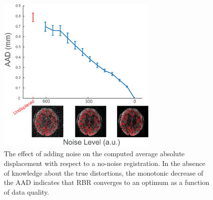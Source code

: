 \begin{figure}[!ht]
\centering
\includegraphics[width=0.7\textwidth, clip=true]{./Chapters/02_Registration/Images/./AAD}
\caption{
	The effect of adding noise on the computed average absolute displacement with respect to a no-noise registration. In the absence of knowledge about the true distortions, the monotonic decrease of the AAD indicates that RBR converges to an optimum as a function of data quality.}
\label{fig:aad}
\end{figure}